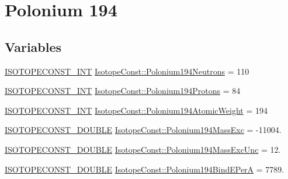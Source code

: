 \hypertarget{group___isotope_const-_polonium-_po194}{}\section{Polonium 194}
\label{group___isotope_const-_polonium-_po194}
\subsection*{Variables}
\begin{DoxyCompactItemize}
\item 
\mbox{\hyperlink{group___isotope_const-_macros_ga5f18360b3e99483a35c32d789e62621c}{I\+S\+O\+T\+O\+P\+E\+C\+O\+N\+S\+T\+\_\+\+I\+NT}} \mbox{\hyperlink{group___isotope_const-_polonium-_po194_ga0e85f05ef64b8ec2d139bb90825e3a67}{Isotope\+Const\+::\+Polonium194\+Neutrons}} = 110
\item 
\mbox{\hyperlink{group___isotope_const-_macros_ga5f18360b3e99483a35c32d789e62621c}{I\+S\+O\+T\+O\+P\+E\+C\+O\+N\+S\+T\+\_\+\+I\+NT}} \mbox{\hyperlink{group___isotope_const-_polonium-_po194_ga11ec2b9cb9651ef131fbd6dd05298900}{Isotope\+Const\+::\+Polonium194\+Protons}} = 84
\item 
\mbox{\hyperlink{group___isotope_const-_macros_ga5f18360b3e99483a35c32d789e62621c}{I\+S\+O\+T\+O\+P\+E\+C\+O\+N\+S\+T\+\_\+\+I\+NT}} \mbox{\hyperlink{group___isotope_const-_polonium-_po194_gacafa8bcc6d2a79bb5bd829ccb2467d43}{Isotope\+Const\+::\+Polonium194\+Atomic\+Weight}} = 194
\item 
\mbox{\hyperlink{group___isotope_const-_macros_ga8f45a7272ce02c0b4c65c44636ed719a}{I\+S\+O\+T\+O\+P\+E\+C\+O\+N\+S\+T\+\_\+\+D\+O\+U\+B\+LE}} \mbox{\hyperlink{group___isotope_const-_polonium-_po194_ga920ac4a318e2af6c0cb3c913ba6978aa}{Isotope\+Const\+::\+Polonium194\+Mass\+Exc}} = -\/11004.
\item 
\mbox{\hyperlink{group___isotope_const-_macros_ga8f45a7272ce02c0b4c65c44636ed719a}{I\+S\+O\+T\+O\+P\+E\+C\+O\+N\+S\+T\+\_\+\+D\+O\+U\+B\+LE}} \mbox{\hyperlink{group___isotope_const-_polonium-_po194_gae44baa7b580b6681cd38bea28c3dc83a}{Isotope\+Const\+::\+Polonium194\+Mass\+Exc\+Unc}} = 12.
\item 
\mbox{\hyperlink{group___isotope_const-_macros_ga8f45a7272ce02c0b4c65c44636ed719a}{I\+S\+O\+T\+O\+P\+E\+C\+O\+N\+S\+T\+\_\+\+D\+O\+U\+B\+LE}} \mbox{\hyperlink{group___isotope_const-_polonium-_po194_gae0d31a76eb8e5fb049e213f96ec0b823}{Isotope\+Const\+::\+Polonium194\+Bind\+E\+PerA}} = 7789.
\item 

\end{DoxyCompactItemize}
